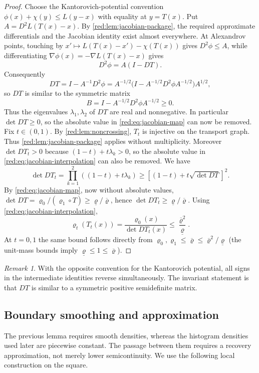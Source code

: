\documentclass[11pt]{article}
\theoremstyle{definition}
\theoremstyle{remark}
\newtheorem{remark}[remark]{Remark}
\numberwithin{equation}{section}
\newcommand{\br}[1]{\left[#1\right]}
\begin{document}
\begin{proof}
Choose the Kantorovich-potential convention
$\phi(x)+\chi(y)\le L(y-x)$ with equality at $y=T(x)$.  Put
$A=D^2L(T(x)-x)$.  By \cref{red:lem:jacobian-package}, the required approximate
differentials and the Jacobian identity exist almost everywhere.  At Alexandrov points, touching by
$x'\mapsto L(T(x)-x')-\chi(T(x))$ gives $D^2\phi\le A$, while
differentiating $\nabla\phi(x)=-\nabla L(T(x)-x)$ gives
\[
 D^2\phi=A(I-DT).
\]
Consequently
\[
 DT=I-A^{-1}D^2\phi
 =A^{-1/2}\bigl(I-A^{-1/2}D^2\phi A^{-1/2}\bigr)A^{1/2},
\]
so $DT$ is similar to the symmetric matrix
\[
 B=I-A^{-1/2}D^2\phi A^{-1/2}\ge0.
\]
Thus the eigenvalues $\lambda_1,\lambda_2$ of $DT$ are real and nonnegative.
In particular $\det DT\ge0$, so the absolute value in
\eqref{red:eq:jacobian-map} can now be removed.  Fix $t\in(0,1)$.  By
\cref{red:lem:noncrossing}, $T_t$ is injective on the transport graph.  Thus
\cref{red:lem:jacobian-package} applies without multiplicity.  Moreover
$\det DT_t>0$ because $(1-t)+t\lambda_k>0$, so the absolute value in
\eqref{red:eq:jacobian-interpolation} can also be removed.  We have
\[
 \det DT_t
 =\prod_{k=1}^2((1-t)+t\lambda_k)
 \ge\br{(1-t)+t\sqrt{\det DT}}^2.
\]
By \eqref{red:eq:jacobian-map}, now without absolute values,
$\det DT=\varrho_0/(\varrho_1\circ T)\ge \underline\varrho/\overline\varrho$, hence
$\det DT_t\ge \underline\varrho/\overline\varrho$.  Using \eqref{red:eq:jacobian-interpolation},
\[
 \varrho_t(T_t(x))=\frac{\varrho_0(x)}{\det DT_t(x)}
 \le\frac{\overline\varrho^2}{\underline\varrho}.
\]
At $t=0,1$ the same bound follows directly from
$\varrho_0,\varrho_1\le\overline\varrho\le \overline\varrho^2/\underline\varrho$ (the unit-mass bounds imply
$\underline\varrho\le1\le\overline\varrho$).
\end{proof}

\begin{remark}
With the opposite convention for the Kantorovich potential, all signs in the
intermediate identities reverse simultaneously.  The invariant statement is
that $DT$ is similar to a symmetric positive semidefinite matrix.
\end{remark}

\subsection{Boundary smoothing and approximation}

The previous lemma requires smooth densities, whereas the histogram densities
used later are piecewise constant. The passage between them requires a
recovery approximation, not merely lower semicontinuity. We use the
following local construction on the square.
\end{document}
